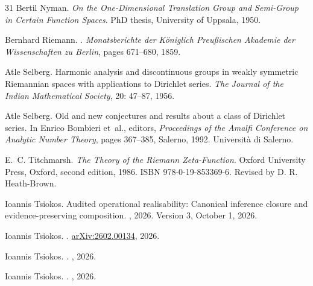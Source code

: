 \documentclass[11pt]{article}
\theoremstyle{definition}
\begin{document}
\begin{thebibliography}{31}
Bertil Nyman.
\newblock \emph{On the One-Dimensional Translation Group and Semi-Group in Certain Function Spaces}.
\newblock PhD thesis, University of Uppsala, 1950.

Bernhard Riemann.
.
\newblock \emph{Monatsberichte der K{\"o}niglich Preu{\ss}ischen Akademie der Wissenschaften zu Berlin}, pages 671--680, 1859.

Atle Selberg.
\newblock Harmonic analysis and discontinuous groups in weakly symmetric {Riemannian} spaces with applications to {Dirichlet} series.
\newblock \emph{The Journal of the Indian Mathematical Society}, 20: 47--87, 1956.

Atle Selberg.
\newblock Old and new conjectures and results about a class of {Dirichlet} series.
\newblock In Enrico Bombieri et~al., editors, \emph{Proceedings of the Amalfi Conference on Analytic Number Theory}, pages 367--385, Salerno, 1992. Universit{\`a} di Salerno.

E.~C. Titchmarsh.
\newblock \emph{The Theory of the {Riemann} Zeta-Function}.
\newblock Oxford University Press, Oxford, second edition, 1986.
\newblock ISBN 978-0-19-853369-6.
\newblock Revised by D. R. Heath-Brown.

Ioannis Tsiokos.
\newblock Audited operational realisability: Canonical inference closure and evidence-preserving composition.
\newblock {}, 2026{}.
\newblock Version 3, October 1, 2026.

Ioannis Tsiokos.
.
\newblock \href{https://arxiv.org/abs/2602.00134}{arXiv:2602.00134}, 2026{}.

Ioannis Tsiokos.
.
\newblock {}, 2026{}.

Ioannis Tsiokos.
.
\newblock {}, 2026{}.


\end{thebibliography}
\end{document}
